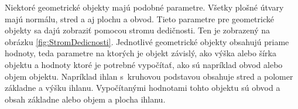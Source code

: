 Niektoré geometrické objekty majú podobné parametre. Všetky plošné útvary majú normálu, stred a aj plochu a obvod. 
Tieto parametre pre geometrické objekty sa dajú zobraziť pomocou stromu dedičnosti. Ten je zobrazený na obrázku \ref{fig:StromDedicnosti}.  Jednotlivé geometrické objekty obsahujú priame hodnoty, teda parametre na ktorých je objekt závislý, ako výška alebo šírka objektu a hodnoty ktoré je potrebné vypočítať, ako sú napríklad obvod alebo objem objektu. Napríklad ihlan s~kruhovou podstavou obsahuje stred a polomer základne a výšku ihlanu. Vypočítanými hodnotami tohto objektu sú obvod a obsah základne alebo objem a plocha ihlanu.  

